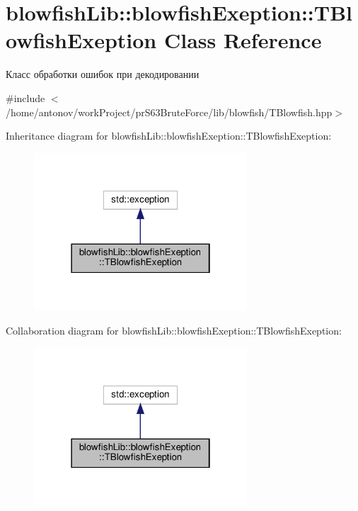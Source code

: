\hypertarget{classblowfish_lib_1_1blowfish_exeption_1_1_t_blowfish_exeption}{}\section{blowfish\+Lib\+:\+:blowfish\+Exeption\+:\+:T\+Blowfish\+Exeption Class Reference}
\label{classblowfish_lib_1_1blowfish_exeption_1_1_t_blowfish_exeption}


Класс обработки ошибок при декодировании  




{\ttfamily \#include $<$/home/antonov/work\+Project/pr\+S63\+Brute\+Force/lib/blowfish/\+T\+Blowfish.\+hpp$>$}



Inheritance diagram for blowfish\+Lib\+:\+:blowfish\+Exeption\+:\+:T\+Blowfish\+Exeption\+:
\nopagebreak
\begin{figure}[H]
\begin{center}
\leavevmode
\includegraphics[width=226pt]{classblowfish_lib_1_1blowfish_exeption_1_1_t_blowfish_exeption__inherit__graph}
\end{center}
\end{figure}


Collaboration diagram for blowfish\+Lib\+:\+:blowfish\+Exeption\+:\+:T\+Blowfish\+Exeption\+:
\nopagebreak
\begin{figure}[H]
\begin{center}
\leavevmode
\includegraphics[width=226pt]{classblowfish_lib_1_1blowfish_exeption_1_1_t_blowfish_exeption__coll__graph}
\end{center}
\end{figure}
